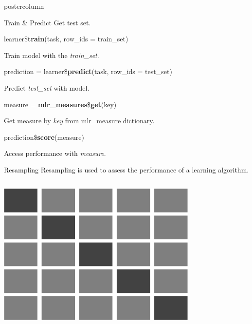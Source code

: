 \documentclass{beamer}
\begin{document}
\begin{frame}[fragile]{}
\begin{columns}
\begin{column}{.31\textwidth}
\begin{beamercolorbox}[center]{postercolumn}
\begin{minipage}{.98\textwidth}
{\begin{myblock}{Train \& Predict}
						\hspace*{1ex}Get test set.
						\\
						\begin{codebox}
							learner\$\textbf{train}(task, row\_ids = train\_set)
						\end{codebox}
						\hspace*{1ex}Train model with the \textit{train\_set}.
						\\
						\begin{codebox}
							prediction = learner\$\textbf{predict}(task, row\_ids = test\_set)
						\end{codebox}
						\hspace*{1ex}Predict \textit{test\_set} with model.
						\\
						\begin{codebox}
							measure = \textbf{mlr\_measures}\$\textbf{get}(key)
						\end{codebox}
						\hspace*{1ex}Get measure by \textit{key} from mlr\_measure dictionary.
						\\
						\begin{codebox}
							prediction\$\textbf{score}(measure)
						\end{codebox}
						\hspace*{1ex}Access performance with \textit{measure}.
					\end{myblock}
					\begin{myblock}{Resampling}
						Resampling is used to assess the performance of a learning algorithm.
						\\[\baselineskip]
						\begin{minipage}{\textwidth}
							\begin{columns}[T]
								\begin{column}{0.2\textwidth}
									\includegraphics[width=\textwidth]{img/cross_validation.png}

\end{column}
\end{columns}
\end{minipage}
\end{myblock}}
\end{minipage}
\end{beamercolorbox}
\end{column}
\end{columns}
\end{frame}
\end{document}
